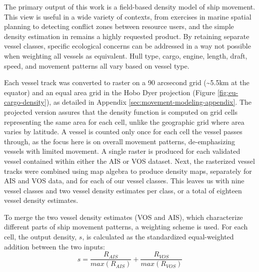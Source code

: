 The primary output of this work is a field-based density model of ship movement. This view is useful in a wide variety of contexts, from exercises in marine spatial planning to detecting conflict zones between resource users, and the simple density estimation in \cite{Halpern2008} remains a highly requested product. By retaining separate vessel classes, specific ecological concerns can be addressed in a way not possible when weighting all vessels as equivalent. Hull type, cargo, engine, length, draft, speed, and movement patterns all vary based on vessel type.

Each vessel track was converted to raster on a 90 arcsecond grid (\textasciitilde{}5.5km at the equator) and an equal area grid in the Hobo Dyer projection (Figure \ref{fig:eu-cargo-density}), as detailed in Appendix \ref{sec:movement-modeling-appendix}. The projected version assures that the density function is computed on grid cells representing the same area for each cell, unlike the geographic grid where area varies by latitude. A vessel is counted only once for each cell the vessel passes through, as the focus here is on overall movement patterns, de-emphasizing vessels with limited movement. A single raster is produced for each validated vessel contained within either the AIS or VOS dataset. Next, the rasterized vessel tracks were combined using map algebra to produce density maps, separately for AIS and VOS data, and for each of our vessel classes. This leaves us with nine vessel classes and two vessel density estimates per class, or a total of eighteen vessel density estimates.%

To merge the two vessel density estimates (VOS and AIS), which characterize different parts of ship movement patterns, a weighting scheme is used. For each cell, the output density, $s$, is calculated as the standardized equal-weighted addition between the two inputs:
\begin{equation}
 s = \frac{R_{AIS}}{max(R_{AIS})} + \frac{R_{VOS}}{max(R_{VOS})} 
\end{equation}

